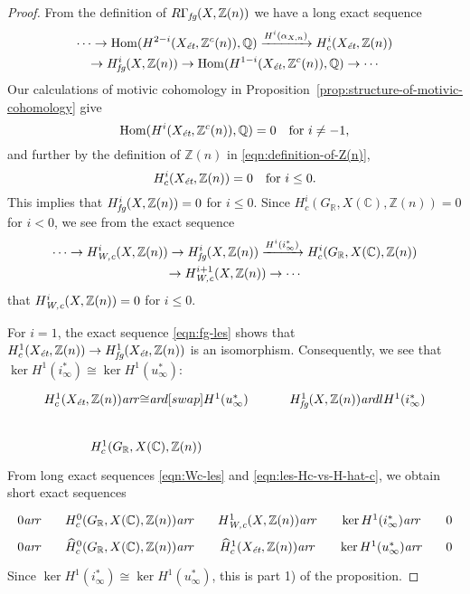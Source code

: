 \documentclass{article}
\DeclareMathOperator{\Hom}{Hom}
\newcommand{\CC}{\mathbb{C}}
\newcommand{\QQ}{\mathbb{Q}}
\newcommand{\RR}{\mathbb{R}}
\newcommand{\ZZ}{\mathbb{Z}}
\newcommand{\ar}{\text{\it ar}}
\newcommand{\et}{\text{\it \'{e}t}}
\newcommand{\fg}{\text{\it fg}}
\newcommand{\Wc}{\text{\it W,c}}
\theoremstyle{myplain}
\theoremstyle{mydefinition}
\begin{document}
\begin{proof}
  From the definition of $R\Gamma_\fg (X, \ZZ(n))$ we have a long exact
  sequence
  \begin{multline}
    \label{eqn:fg-les}
    \cdots \to \Hom (H^{2-i} (X_\et, \ZZ^c (n)), \QQ) \xrightarrow{H^i (\alpha_{X,n})} H^i_c (X_\et, \ZZ(n)) \\
    \to H^i_\fg (X, \ZZ(n)) \to \Hom (H^{1-i} (X_\et, \ZZ^c (n)), \QQ)
    \to \cdots
  \end{multline}
  Our calculations of motivic cohomology in
  Proposition~\ref{prop:structure-of-motivic-cohomology} give
  $$\Hom (H^i (X_\et, \ZZ^c (n)), \QQ) = 0 \quad \text{for }i \ne -1,$$
  and further by the definition of $\ZZ(n)$ in \eqref{eqn:definition-of-Z(n)},
  $$H^i_c (X_\et, \ZZ(n)) = 0 \quad \text{for }i \le 0.$$
  This implies that $H^i_\fg (X, \ZZ(n)) = 0$ for $i \le 0$.
  Since $H^i_c (G_\RR, X(\CC), \ZZ(n)) = 0$ for $i < 0$, we see from the exact
  sequence
  \begin{multline}
    \label{eqn:Wc-les}
    \cdots \to H^i_\Wc (X, \ZZ(n)) \to
    H^i_\fg (X,\ZZ(n)) \xrightarrow{H^i (i^*_\infty)}
    H^i_c (G_\RR, X(\CC), \ZZ(n)) \\
    \to H^{i+1}_\Wc (X, \ZZ(n)) \to \cdots
  \end{multline}
  that $H^i_\Wc (X, \ZZ(n)) = 0$ for $i \le 0$.

  \vspace{1em}

  For $i = 1$, the exact sequence \eqref{eqn:fg-les} shows that
  $H^1_c (X_\et, \ZZ(n)) \to H^1_\fg (X_\et, \ZZ(n))$ is an isomorphism.
  Consequently, we see that
  $\ker H^1 (i^*_\infty) \cong \ker H^1 (u_\infty^*)$:
  \[ \begin{tikzcd}
      H^1_c (X_\et, \ZZ(n)) \ar{r}{\cong}\ar{d}[swap]{H^1 (u^*_\infty)} & H^1_\fg (X, \ZZ(n)) \ar{dl}{H^1 (i^*_\infty)} \\
      H^1_c (G_\RR, X(\CC), \ZZ(n))
    \end{tikzcd} \]
  From long exact sequences \eqref{eqn:Wc-les} and
  \eqref{eqn:les-Hc-vs-H-hat-c}, we obtain short exact sequences
  \[ \begin{tikzcd}[column sep=1em,row sep=0pt]
      0 \ar{r} & H^0_c (G_\RR, X(\CC), \ZZ(n)) \ar{r} & H^1_\Wc (X, \ZZ(n)) \ar{r} & \ker H^1 (i^*_\infty) \ar{r} & 0 \\
      0 \ar{r} & \widehat{H}^0_c (G_\RR, X(\CC), \ZZ(n)) \ar{r} & \widehat{H}^1_c (X_\et, \ZZ(n)) \ar{r} & \ker H^1 (u_\infty^*) \ar{r} & 0
    \end{tikzcd} \]
  Since $\ker H^1 (i^*_\infty) \cong \ker H^1 (u_\infty^*)$,
  this is part 1) of the proposition.


\end{proof}
\end{document}
